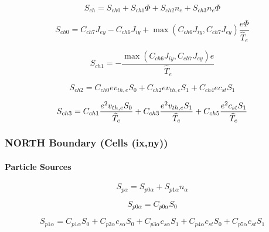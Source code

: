 \documentclass[11pt]{article}
\begin{document}
\begin{equation}
S_{ch}=S_{ch0}+S_{ch1}\Phi+S_{ch2}n_{e}+S_{ch3}n_{e}\Phi   \label{39}
\end{equation}

\begin{equation}
S_{ch0}=C_{ch7}J_{ey}-C_{ch6}J_{iy}+\max\left(
C_{ch6}J_{iy},C_{ch7}J_{ey}\right) \frac{e\Phi}{\widehat{T}_{e}}   \label{40}
\end{equation}
\bigskip

\begin{equation}
S_{ch1}=-\frac{\max\left( C_{ch6}J_{iy},C_{ch7}J_{ey}\right) e}{\widehat
{T}_{e}}   \label{41}
\end{equation}

\begin{equation}
S_{ch2}=C_{ch0}ev_{th,e}S_{0}+C_{ch2}ev_{th,e}S_{1}+C_{ch4}ec_{st}S_{1} 
\label{42}
\end{equation}

\begin{equation}
S_{ch3}=C_{ch1}\frac{e^{2}v_{th,e}S_{0}}{\widehat{T}_{e}}+C_{ch3}\frac
{e^{2}v_{th,e}S_{1}}{\widehat{T}_{e}}+C_{ch5}\frac{e^{2}c_{st}S_{1}}{%
\widehat{T}_{e}}   \label{43}
\end{equation}

\bigskip

\subsubsection{NORTH Boundary (Cells (ix,ny))}

\bigskip

\paragraph{Particle Sources}

\begin{equation}
S_{p\alpha}=S_{p0\alpha}+S_{p1\alpha}n_{\alpha}   \label{44}
\end{equation}

\begin{equation}
S_{p0\alpha}=C_{p0\alpha}S_{0}   \label{45}
\end{equation}

\begin{equation}
S_{p1\alpha}=C_{p1\alpha}S_{0}+C_{p2\alpha}c_{s\alpha}S_{0}+C_{p3\alpha
}c_{s\alpha}S_{1}+C_{p4\alpha}c_{st}S_{0}+C_{p5\alpha}c_{st}S_{1} 
\label{46}
\end{equation}
\end{document}
